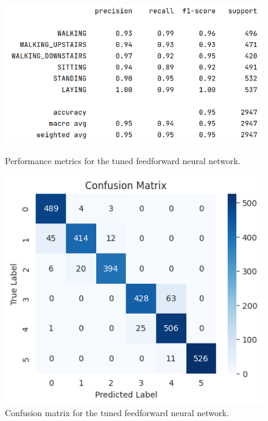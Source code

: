 \begin{figure}[ht]
    \centering
    \begin{minipage}{0.45\textwidth}
        \centering
        \includegraphics[width=\textwidth]{./img/ffnn/tuned/performance-metrics}
        \caption{Performance metrics for the tuned feedforward neural network.}
        \label{fig:ffnn-tuned-performance-metrics}
    \end{minipage}\hfill
    \begin{minipage}{0.45\textwidth}
        \centering
        \includegraphics[width=\textwidth]{./img/ffnn/tuned/confusion-matrix}
        \caption{Confusion matrix for the tuned feedforward neural network.}
        \label{fig:ffnn-tuned-confusion-matrix}
    \end{minipage}
\end{figure}

